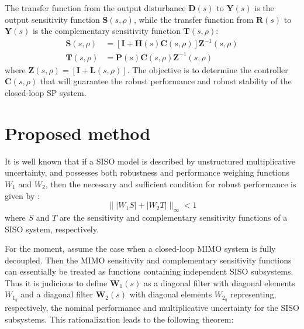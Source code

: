 \documentclass[A4, 10pt, conference]{ieeeconf}
\renewcommand{\vec}[1]{\mathbf{#1}}
\begin{document}

The transfer function from the output disturbance $\vec{D}(s)$ to $\vec{Y}(s)$ is the output sensitivity function $\vec{S}(s,\rho)$, while the transfer function from $\vec{R}(s)$ to $\vec{Y}(s)$ is the complementary sensitivity function $\vec{T}(s,\rho)$:
\begin{equation}  \label{eq:sens_mimo}
\begin{split}
\vec{S}(s,\rho)&=[\vec{I}+\vec{H}(s)\vec{C}(s,\rho)]\vec{Z}^{-1}(s,\rho) \\ \vec{T}(s,\rho)&=\vec{P}(s) \vec{C}(s,\rho) \vec{Z}^{-1}(s,\rho) 
\end{split}
\end{equation}
where $\vec{Z}(s,\rho)=[\vec{I}+\vec{L}(s,\rho)]$. The objective is to determine the controller $\vec{C}(s,\rho)$ that will guarantee the robust performance and robust stability of the closed-loop SP system. 
\section{Proposed method}
\label{sec:3}
It is well known that if a SISO model is described by unstructured multiplicative uncertainty, and possesses both robustness and performance weighing functions $W_1$ and $W_2$, then the necessary and sufficient condition for robust performance is given by \cite{DFT92}:
\begin{equation}
\||W_1S|+|W_2T|\|_{\infty}<1
\end{equation}
where $S$ and $T$ are the sensitivity and complementary  sensitivity functions of a SISO system, respectively. 

For the moment, assume the case when a closed-loop MIMO system is fully decoupled. Then the MIMO sensitivity and complementary sensitivity functions can essentially be treated as functions containing independent SISO subsystems. Thus it is judicious to define $\vec{W}_1(s)$ as a diagonal filter with diagonal elements $W_{1_{q}}$ and a diagonal filter $\vec{W}_2(s)$ with diagonal elements $W_{2_{q}}$ representing, respectively, the nominal performance and multiplicative uncertainty for the SISO subsystems. This rationalization leads to the following theorem:  
 
\end{document}
